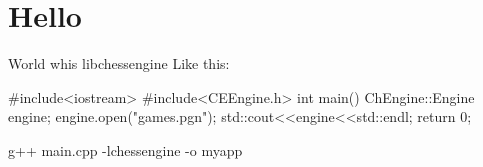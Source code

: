 \hypertarget{Hello-example}{
\section{Hello}
}
World whis libchessengine Like this: 
\begin{DoxyCode}
                #include<iostream>
                #include<CEEngine.h>
                    int main()
                {
                    ChEngine::Engine engine;
                    engine.open("games.pgn");
                    std::cout<<engine<<std::endl;
                    return 0;
                }
\end{DoxyCode}
 g++ main.cpp -\/lchessengine -\/o myapp


\begin{DoxyCodeInclude}
\end{DoxyCodeInclude}
 